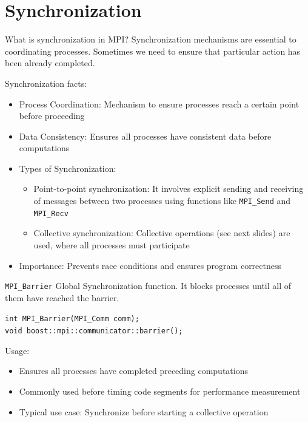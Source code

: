 \documentclass{beamer}
\begin{document}
\section{Synchronization}

\begin{frame}{What is synchronization in MPI?}
  Synchronization mechanisms are essential to coordinating processes.
  Sometimes we need to ensure that particular action has been already completed.

  Synchronization facts:

  \begin{itemize}
    \item Process Coordination: Mechanism to ensure processes reach a certain point before proceeding
    \item Data Consistency: Ensures all processes have consistent data before computations
    \item Types of Synchronization:
    \begin{itemize}
      \item Point-to-point synchronization: It involves explicit sending and receiving of messages between two processes using functions like \texttt{MPI\_Send} and \texttt{MPI\_Recv}
      \item Collective synchronization: Collective operations (see next slides) are used, where all processes must participate
    \end{itemize}
    \item Importance: Prevents race conditions and ensures program correctness
  \end{itemize}
\end{frame}

\begin{frame}{\texttt{MPI\_Barrier}}
  Global Synchronization function. It blocks processes until all of them have reached the barrier.

  {
    \footnotesize
    \texttt{int MPI\_Barrier(MPI\_Comm comm);} \\
    \texttt{void boost::mpi::communicator::barrier();}
  }

  Usage:

  \begin{itemize}
    \item Ensures all processes have completed preceding computations
    \item Commonly used before timing code segments for performance measurement
    \item Typical use case: Synchronize before starting a collective operation
  \end{itemize}
\end{frame}
\end{document}
